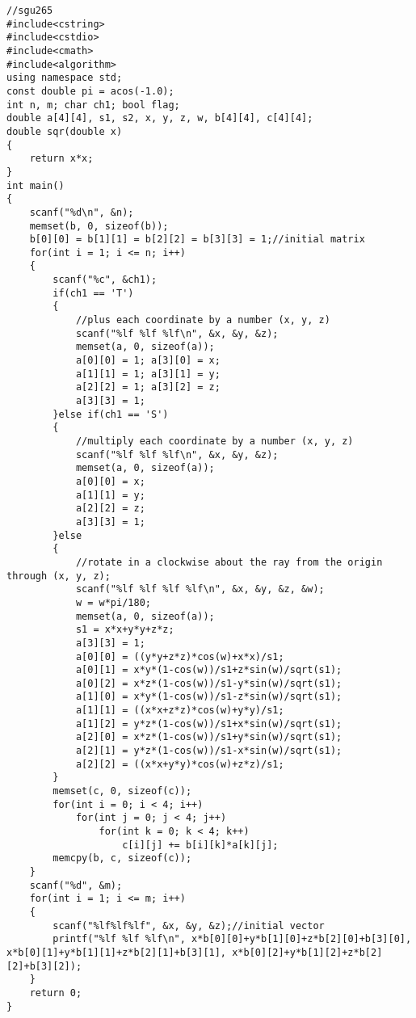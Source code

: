 \begin{lstlisting}
//sgu265
#include<cstring>
#include<cstdio>
#include<cmath>
#include<algorithm>
using namespace std;
const double pi = acos(-1.0);
int n, m; char ch1; bool flag;
double a[4][4], s1, s2, x, y, z, w, b[4][4], c[4][4];
double sqr(double x)
{
	return x*x;
}
int main()
{
	scanf("%d\n", &n);
	memset(b, 0, sizeof(b));
	b[0][0] = b[1][1] = b[2][2] = b[3][3] = 1;//initial matrix
	for(int i = 1; i <= n; i++)
	{
		scanf("%c", &ch1);
		if(ch1 == 'T')
		{
			//plus each coordinate by a number (x, y, z)
			scanf("%lf %lf %lf\n", &x, &y, &z);
			memset(a, 0, sizeof(a));
			a[0][0] = 1; a[3][0] = x;
			a[1][1] = 1; a[3][1] = y;
			a[2][2] = 1; a[3][2] = z;
			a[3][3] = 1;
		}else if(ch1 == 'S')
		{
			//multiply each coordinate by a number (x, y, z)
			scanf("%lf %lf %lf\n", &x, &y, &z);
			memset(a, 0, sizeof(a));
			a[0][0] = x;
			a[1][1] = y;
			a[2][2] = z;
			a[3][3] = 1;
		}else
		{
			//rotate in a clockwise about the ray from the origin through (x, y, z);
			scanf("%lf %lf %lf %lf\n", &x, &y, &z, &w);
			w = w*pi/180;
			memset(a, 0, sizeof(a));
			s1 = x*x+y*y+z*z;
			a[3][3] = 1;
			a[0][0] = ((y*y+z*z)*cos(w)+x*x)/s1;			
			a[0][1] = x*y*(1-cos(w))/s1+z*sin(w)/sqrt(s1);	
			a[0][2] = x*z*(1-cos(w))/s1-y*sin(w)/sqrt(s1);
			a[1][0] = x*y*(1-cos(w))/s1-z*sin(w)/sqrt(s1);	
			a[1][1] = ((x*x+z*z)*cos(w)+y*y)/s1;			
			a[1][2] = y*z*(1-cos(w))/s1+x*sin(w)/sqrt(s1);
			a[2][0] = x*z*(1-cos(w))/s1+y*sin(w)/sqrt(s1);	
			a[2][1] = y*z*(1-cos(w))/s1-x*sin(w)/sqrt(s1);	
			a[2][2] = ((x*x+y*y)*cos(w)+z*z)/s1;
		}
		memset(c, 0, sizeof(c));
		for(int i = 0; i < 4; i++)
			for(int j = 0; j < 4; j++)
				for(int k = 0; k < 4; k++)
					c[i][j] += b[i][k]*a[k][j];
		memcpy(b, c, sizeof(c));
	}
	scanf("%d", &m);
	for(int i = 1; i <= m; i++)
	{
		scanf("%lf%lf%lf", &x, &y, &z);//initial vector
		printf("%lf %lf %lf\n", x*b[0][0]+y*b[1][0]+z*b[2][0]+b[3][0], x*b[0][1]+y*b[1][1]+z*b[2][1]+b[3][1], x*b[0][2]+y*b[1][2]+z*b[2][2]+b[3][2]);
	}
	return 0;
}
\end{lstlisting}
